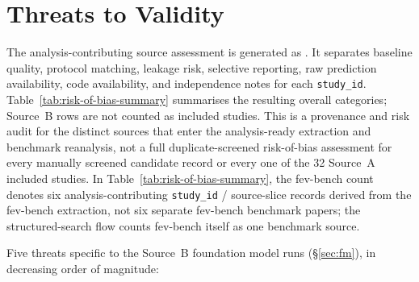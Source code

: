 \section{Threats to Validity}\label{app:threats}

The analysis-contributing source assessment is generated as
.  It separates baseline quality,
protocol matching, leakage risk, selective reporting, raw prediction
availability, code availability, and independence notes for each
\texttt{study\_id}.  Table~\ref{tab:risk-of-bias-summary} summarises the
resulting overall categories; Source~B rows are not counted as included
studies.  This is a provenance and risk audit for the distinct sources that
enter the analysis-ready extraction and benchmark reanalysis, not a full
duplicate-screened risk-of-bias assessment for every manually screened
candidate record or every one of the 32 Source~A included studies.
In Table~\ref{tab:risk-of-bias-summary}, the fev-bench count denotes six
analysis-contributing \texttt{study\_id} / source-slice records derived from
the fev-bench extraction, not six separate fev-bench benchmark papers; the
structured-search flow counts fev-bench itself as one benchmark source.



Five threats specific to the Source~B foundation model runs
(\S\ref{sec:fm}),
in decreasing order of magnitude:

